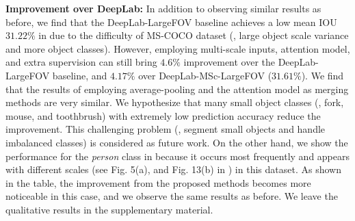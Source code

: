\textbf{Improvement over DeepLab:} In addition to observing similar results as before, we find that the DeepLab-LargeFOV baseline achieves a low mean IOU $31.22 \%$ in  due to the difficulty of MS-COCO dataset (\eg, large object scale variance and more object classes). However, employing multi-scale inputs, attention model, and extra supervision can still bring $4.6\%$ improvement over the DeepLab-LargeFOV baseline, and $4.17\%$ over DeepLab-MSc-LargeFOV ($31.61\%$). We find that the results of employing average-pooling and the attention model as merging methods are very similar. We hypothesize that many small object classes (\eg, fork, mouse, and toothbrush) with extremely low prediction accuracy reduce the improvement. This challenging problem (\ie, segment small objects and handle imbalanced classes) is considered as future work. On the other hand, we show the performance for the {\it person} class in  because it occurs most frequently and appears with different scales (see Fig. 5(a), and Fig. 13(b) in \cite{lin2014microsoft}) in this dataset. As shown in the table, the improvement from the proposed methods becomes more noticeable in this case, and we observe the same results as before. We leave the qualitative results in the supplementary material.


